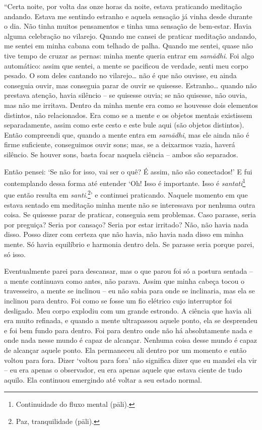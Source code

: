 ``Certa noite, por volta das onze horas da noite, estava praticando
meditação andando. Estava me sentindo estranho e aquela sensação já
vinha desde durante o dia. Não tinha muitos pensamentos e tinha uma
sensação de bem-estar. Havia alguma celebração no vilarejo. Quando me
cansei de praticar meditação andando, me sentei em minha cabana com
telhado de palha. Quando me sentei, quase não tive tempo de cruzar as
pernas: minha mente queria entrar em \emph{samādhi}. Foi algo
automático: assim que sentei, a mente se pacificou de verdade, senti meu
corpo pesado. O som deles cantando no vilarejo\ldots{} não é que não
ouvisse, eu ainda conseguia ouvir, mas conseguia parar de ouvir se
quisesse. Estranho\ldots{} quando não prestava atenção, havia silêncio
-- se quisesse ouvia; se não quisesse, não ouvia, mas não me irritava.
Dentro da minha mente era como se houvesse dois elementos distintos, não
relacionados. Era como se a mente e os objetos mentais existissem
separadamente, assim como este cesto e este bule aqui (são objetos
distintos). Então compreendi que, quando a mente entra em
\emph{samādhi}, mas ele ainda não é firme suficiente, conseguimos ouvir
sons; mas, se a deixarmos vazia, haverá silêncio. Se houver sons, basta
focar naquela ciência -- ambos são separados.

Então pensei: `Se não for isso, vai ser o quê? É assim, não são
conectados!' E fui contemplando dessa forma até entender `Oh! Isso é
importante. Isso é \emph{santati}\footnote{Continuidade do fluxo mental
  (pāli).} que então resulta em \emph{santi}.\footnote{Paz, tranquilidade
  (pāli).}' e continuei praticando. Naquele momento em que
estava sentado em meditação minha mente não se interessava por nenhuma
outra coisa. Se quisesse parar de praticar, conseguia sem problemas.
Caso parasse, seria por preguiça? Seria por cansaço? Seria por estar
irritado? Não, não havia nada disso. Posso dizer com certeza que não
havia, não havia nada disso em minha mente. Só havia equilíbrio e
harmonia dentro dela. Se parasse seria porque parei, só isso.

Eventualmente parei para descansar, mas o que parou foi só a postura
sentada -- a mente continuava como antes, não parava. Assim que minha
cabeça tocou o travesseiro, a mente se inclinou -- eu não sabia para
onde se inclinaria, mas ela se inclinou para dentro. Foi como se fosse
um fio elétrico cujo interruptor foi desligado. Meu corpo explodiu com
um grande estrondo. A ciência que havia ali era muito refinada, e quando
a mente ultrapassou aquele ponto, ela se desprendeu e foi bem fundo para
dentro. Foi para dentro onde não há absolutamente nada e onde nada nesse
mundo é capaz de alcançar. Nenhuma coisa desse mundo é capaz de alcançar
aquele ponto. Ela permaneceu ali dentro por um momento e então voltou
para fora. Dizer `voltou para fora' não significa dizer que eu mandei
ela vir -- eu era apenas o observador, eu era apenas aquele que estava
ciente de tudo aquilo. Ela continuou emergindo até voltar a seu estado
normal.

